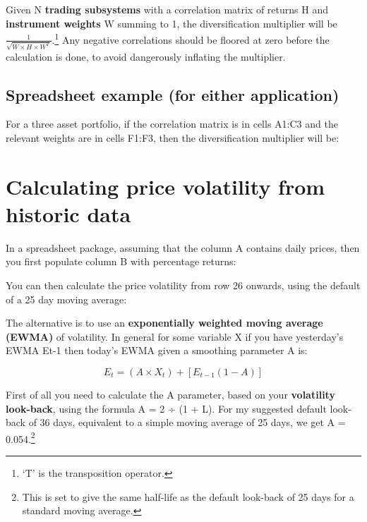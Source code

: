 Given N \textbf{trading subsystems} with a correlation matrix of returns H and \textbf{instrument weights} W summing to 1, the diversification multiplier will be \(\frac{1}{\sqrt{W \times H \times W^T}}\).\footnote{‘T' is the transposition operator.} Any negative correlations should be floored at zero before the calculation is done, to avoid dangerously inflating the multiplier.

\subsection*{Spreadsheet example (for either application)}

For a three asset portfolio, if the correlation matrix is in cells A1:C3 and the relevant weights are in cells F1:F3, then the diversification multiplier will be:

\begin{quote}
\ttfamily{}
\end{quote}

\section*{Calculating price volatility from historic data}  {}

In a spreadsheet package, assuming that the column A contains daily prices, then you first populate column B with percentage returns:

\begin{quote}
\ttfamily{}
\end{quote}

You can then calculate the price volatility from row 26 onwards, using the default of a 25 day moving average:

\begin{quote}
\ttfamily{}
\end{quote}

The alternative is to use an \textbf{exponentially weighted moving average (EWMA)} of volatility. In general for some variable X if you have yesterday's EWMA Et-1 then today's
EWMA given a smoothing parameter A is:

\[E_t = (A \times X_t) + \left[E_{t-1}(1-A)\right] \]

First of all you need to calculate the A parameter, based on your \textbf{volatility look-back}, using the formula A = 2 ÷ (1 + L). For my suggested default look-back of 36 days, equivalent to a simple moving average of 25 days, we get A = 0.054.\footnote{This is set to give the same half-life as the default look-back of 25 days for a standard moving average.}

